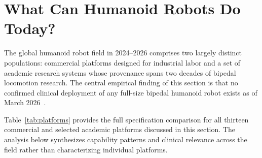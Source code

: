 \documentclass[acmjour]{acmart}
\begin{document}
\section{What Can Humanoid Robots Do Today?}
\label{sec:systems}

The global humanoid robot field in 2024--2026 comprises two largely distinct
populations: commercial platforms designed for industrial labor and a set of
academic research systems whose provenance spans two decades of bipedal
locomotion research. The central empirical finding of this section is that no
confirmed clinical deployment of any full-size bipedal humanoid robot exists as
of March 2026~\cite{atar2025humanoids,cho2026humanoid,cunha2025humanoid}.

Table~\ref{tab:platforms} provides the full specification comparison for all
thirteen commercial and selected academic platforms discussed in this section.
The analysis below synthesizes capability patterns and clinical relevance across
the field rather than characterizing individual platforms.
\end{document}
